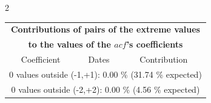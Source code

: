 
\thispagestyle{empty}
\begin{multicols}{2}{ 
\begin{tabular}{ccc}
\multicolumn{3}{c}{\textbf{Contributions of pairs of the extreme values} }  \vspace{-.10in}  \\ 
\multicolumn{3}{c}{ \textbf{to the values of the $acf$'s coefficients}} \\ 
\hline 
\hline                  Coefficient  &  Dates &  Contribution \\ 
\hline 
\multicolumn{3}{c}{               0 values outside (-1,+1):  0.00  \% (31.74  \% expected)}\vspace{-.10in} \\ 
\multicolumn{3}{c}{               0 values outside (-2,+2):  0.00 \%  (4.56 \% expected) } \\
 \end{tabular} \\ 
 } 
\end{multicols} 
